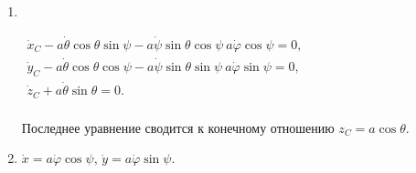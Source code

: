 \begin{enumerate}
\item ~

	\vspace{-1em}
	$\begin{array}{ll}
	\dot{x}_C - a\dot{\theta}\cos{\theta}\sin{\psi} -
	a\dot{\psi}\sin{\theta}\cos{\psi} \ a\dot{\varphi}\cos{\psi} = 0,\\
	\dot{y}_C - a\dot{\theta}\cos{\theta}\cos{\psi} -
	a\dot{\psi}\sin{\theta}\sin{\psi} \ a\dot{\varphi}\sin{\psi} = 0,\\
	\dot{z}_C + a\dot{\theta}\sin{\theta} = 0.\\
	\end{array}$

	Последнее уравнение сводится к конечному отношению $z_C = a\cos{\theta}$.
\item $\dot{x} = a\dot{\varphi}\cos{\psi}$,
	$\dot{y} = a\dot{\varphi}\sin{\psi}$.
\end{enumerate}
